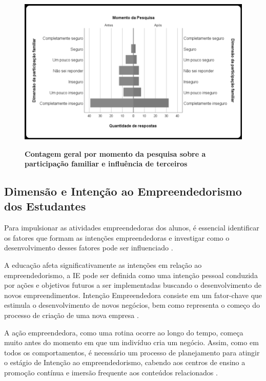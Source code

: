 \begin{figure}[H]
\centering
\caption{\textbf{Contagem geral por momento da pesquisa sobre a participação familiar e influência de terceiros}}
\includegraphics[scale=0.4]{Imagens/dimensao_familiar.png}
\label{figura_60}
\end{figure}


\subsection{Dimensão e Intenção ao Empreendedorismo dos Estudantes}

Para impulsionar as atividades empreendedoras dos alunos, é essencial identificar os fatores que formam as intenções empreendedoras e investigar como o desenvolvimento desses fatores pode ser influenciado \cite{gubik_entrepreneurial_2019}. 

A educação afeta significativamente as intenções em relação ao empreendedorismo, a IE pode ser definida como uma intenção pessoal conduzida por ações e objetivos futuros a ser implementadas buscando o desenvolvimento de novos empreendimentos.
Intenção Empreendedora consiste em um fator-chave que estimula o desenvolvimento de novos negócios, bem como representa o começo do processo de criação de uma nova empresa \cite{vasconcellos-guedes_e-surveys_2007}.

A  ação empreendedora, como uma rotina ocorre ao longo do tempo, começa muito antes do momento em que um indivíduo cria um negócio. Assim, como em todos os comportamentos, é necessário um processo de planejamento para atingir o estágio de Intenção ao empreendedorismo, cabendo aos centros de ensino a promoção contínua e imersão frequente aos conteúdos relacionados \cite{garcia-rodriguez_entrepreneurial_2017}.

